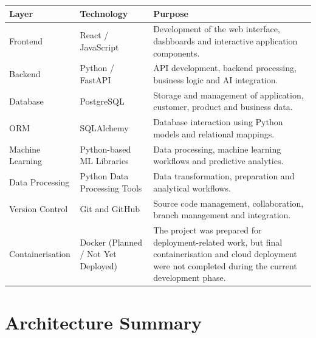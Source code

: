 \documentclass[12pt,a4paper]{report}
\begin{document}
\begin{longtable}{p{3.5cm} p{4cm} p{5cm}}

\toprule

\textbf{Layer} &
\textbf{Technology} &
\textbf{Purpose}

\\

\midrule

Frontend &
React / JavaScript &
Development of the web interface, dashboards and interactive
application components.
\\[6pt]

Backend &
Python / FastAPI &
API development, backend processing, business logic and AI integration.
\\[6pt]

Database &
PostgreSQL &
Storage and management of application, customer, product and business data.
\\[6pt]

ORM &
SQLAlchemy &
Database interaction using Python models and relational mappings.
\\[6pt]

Machine Learning &
Python-based ML Libraries &
Data processing, machine learning workflows and predictive analytics.
\\[6pt]

Data Processing &
Python Data Processing Tools &
Data transformation, preparation and analytical workflows.
\\[6pt]

Version Control &
Git and GitHub &
Source code management, collaboration, branch management and integration.
\\[6pt]

Containerisation &
Docker (Planned / Not Yet Deployed) &
The project was prepared for deployment-related work, but final
containerisation and cloud deployment were not completed during the
current development phase.
\\

\bottomrule

\end{longtable}



\section{Architecture Summary}
\end{document}
